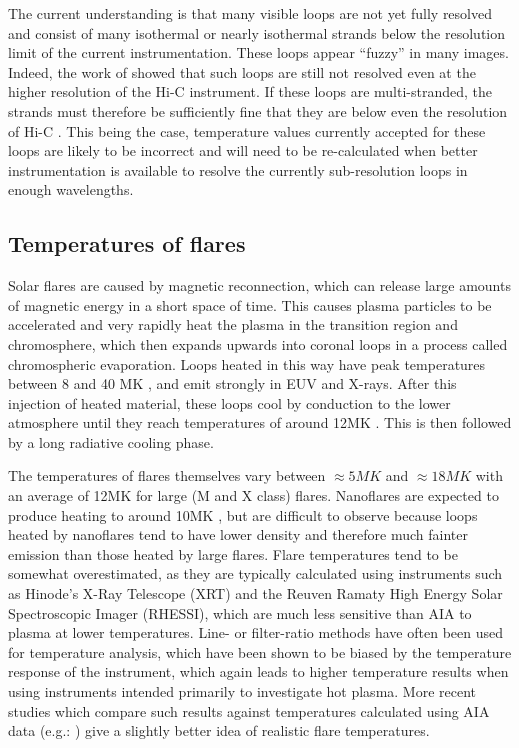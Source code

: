 \documentclass[namedreferences]{solarphysics}
\begin{document}
\begin{article}
The current understanding is that many visible loops are not yet fully resolved and consist of many isothermal or nearly isothermal strands below the resolution limit of the current instrumentation.
These loops appear ``fuzzy'' in many images.
Indeed, the work of \citet{DelZanna2013} showed that such loops are still not resolved even at the higher resolution of the Hi-C instrument.
If these loops are multi-stranded, the strands must therefore be sufficiently fine that they are below even the resolution of Hi-C \citep{Cirtain2013}.
This being the case, temperature values currently accepted for these loops are likely to be incorrect and will need to be re-calculated when better instrumentation is available to resolve the currently sub-resolution loops in enough wavelengths.

\subsection{Temperatures of flares}
Solar flares are caused by magnetic reconnection, which can release large amounts of magnetic energy in a short space of time.
This causes plasma particles to be accelerated and very rapidly heat the plasma in the transition region and chromosphere, which then expands upwards into coronal loops \citep{Simoes2015} in a process called chromospheric evaporation.
Loops heated in this way have peak temperatures between 8 and 40 MK \citep{Ryan2013,Ryan2014}, and emit strongly in EUV and X-rays.
After this injection of heated material, these loops cool by conduction to the lower atmosphere until they reach temperatures of around 12MK \citep{Aschwanden2005}.
This is then followed by a long radiative cooling phase.

The temperatures of flares themselves vary between $\approx5MK$ and $\approx18MK$ with an average of 12MK for large (M and X class) flares.
Nanoflares are expected to produce heating to around 10MK \citep{Reale2011a}, but are difficult to observe because loops heated by nanoflares tend to have lower density and therefore much fainter emission than those heated by large flares.
Flare temperatures tend to be somewhat overestimated, as they are typically calculated using instruments such as Hinode's X-Ray Telescope (XRT) and the Reuven Ramaty High Energy Solar Spectroscopic Imager (RHESSI), which are much less sensitive than AIA to plasma at lower temperatures.
Line- or filter-ratio methods have often been used for temperature analysis, which have been shown to be biased by the temperature response of the instrument, which again leads to higher temperature results when using instruments intended primarily to investigate hot plasma.
More recent studies which compare such results against temperatures calculated using AIA data (e.g.: \citet{Ryan2013,Ryan2014}) give a slightly better idea of realistic flare temperatures.


\end{article}
\end{document}
